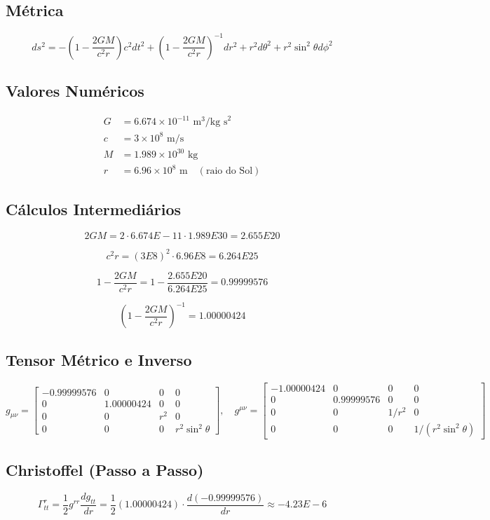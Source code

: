 \documentclass[12pt]{article}
\begin{document}
\subsection{Métrica}
\[
ds^2 = -\left(1-\frac{2GM}{c^2 r}\right)c^2 dt^2 + \left(1-\frac{2GM}{c^2 r}\right)^{-1} dr^2 + r^2 d\theta^2 + r^2 \sin^2\theta d\phi^2
\]

\subsection{Valores Numéricos}
\[
\begin{aligned}
G &= 6.674 \times 10^{-11} \text{ m}^3/\text{kg s}^2 \\
c &= 3 \times 10^8 \text{ m/s} \\
M &= 1.989 \times 10^{30} \text{ kg} \\
r &= 6.96 \times 10^8 \text{ m} \quad (\text{raio do Sol})
\end{aligned}
\]

\subsection{Cálculos Intermediários}
\[
2GM = 2 \cdot 6.674E-11 \cdot 1.989E30 = 2.655E20
\]

\[
c^2 r = (3E8)^2 \cdot 6.96E8 = 6.264E25
\]

\[
1-\frac{2GM}{c^2 r} = 1 - \frac{2.655E20}{6.264E25} = 0.99999576
\]

\[
(1-\frac{2GM}{c^2 r})^{-1} = 1.00000424
\]

\subsection{Tensor Métrico e Inverso}

\[
g_{\mu\nu} =
\begin{bmatrix}
-0.99999576 & 0 & 0 & 0\\
0 & 1.00000424 & 0 & 0\\
0 & 0 & r^2 & 0\\
0 & 0 & 0 & r^2 \sin^2\theta
\end{bmatrix}, \quad
g^{\mu\nu} =
\begin{bmatrix}
-1.00000424 & 0 & 0 & 0\\
0 & 0.99999576 & 0 & 0\\
0 & 0 & 1/r^2 & 0\\
0 & 0 & 0 & 1/(r^2 \sin^2\theta)
\end{bmatrix}
\]

\subsection{Christoffel (Passo a Passo)}
\[
\Gamma^r_{tt} = \frac{1}{2} g^{rr} \frac{d g_{tt}}{dr} 
= \frac{1}{2} (1.00000424) \cdot \frac{d(-0.99999576)}{dr} \approx -4.23E-6
\]
\end{document}

